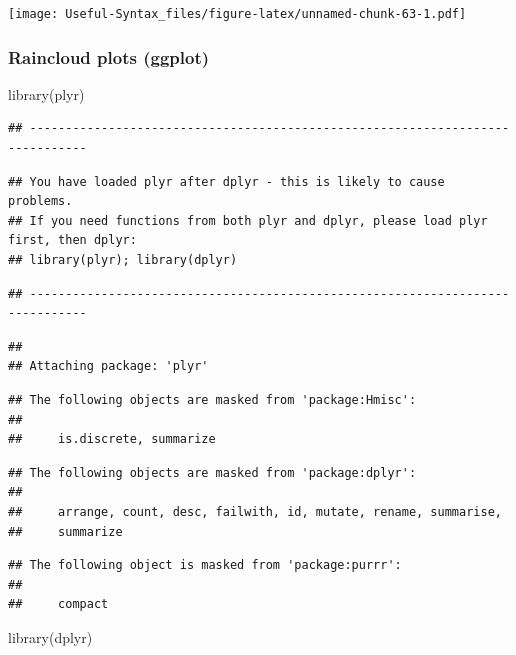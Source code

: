 \documentclass[
]{article}
\newenvironment{Shaded}{\begin{snugshade}}{\end{snugshade}}
\newcommand{\FunctionTok}[1]{\textcolor[rgb]{0.00,0.00,0.00}{#1}}
\newcommand{\NormalTok}[1]{#1}
\begin{document}
\texttt{[image: Useful-Syntax\_files/figure-latex/unnamed-chunk-63-1.pdf]}

\hypertarget{raincloud-plots-ggplot}{%
\subsubsection{Raincloud plots (ggplot)}\label{raincloud-plots-ggplot}}

\begin{Shaded}
\begin{Highlighting}[]
\FunctionTok{library}\NormalTok{(plyr)}
\end{Highlighting}
\end{Shaded}

\begin{verbatim}
## ------------------------------------------------------------------------------
\end{verbatim}

\begin{verbatim}
## You have loaded plyr after dplyr - this is likely to cause problems.
## If you need functions from both plyr and dplyr, please load plyr first, then dplyr:
## library(plyr); library(dplyr)
\end{verbatim}

\begin{verbatim}
## ------------------------------------------------------------------------------
\end{verbatim}

\begin{verbatim}
## 
## Attaching package: 'plyr'
\end{verbatim}

\begin{verbatim}
## The following objects are masked from 'package:Hmisc':
## 
##     is.discrete, summarize
\end{verbatim}

\begin{verbatim}
## The following objects are masked from 'package:dplyr':
## 
##     arrange, count, desc, failwith, id, mutate, rename, summarise,
##     summarize
\end{verbatim}

\begin{verbatim}
## The following object is masked from 'package:purrr':
## 
##     compact
\end{verbatim}

\begin{Shaded}
\begin{Highlighting}[]
\FunctionTok{library}\NormalTok{(dplyr)}
\end{Highlighting}
\end{Shaded}
\end{document}
